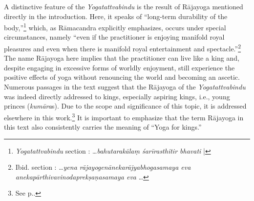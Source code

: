A distinctive feature of the \emph{Yogatattvabindu} is the result of Rājayoga mentioned directly in the introduction. Here, it speaks of ``long-term durability of the body,''\footnote{\emph{Yogatattvabindu} section : \ldots \textit{bahutarakālaṃ śarīrasthitir bhavati} |} which, as Rāmacandra explicitly emphasizes, occurs under special circumstances, namely ``even if the practitioner is enjoying manifold royal pleasures and even when there is manifold royal entertainment and spectacle.''\footnote{Ibid. section : \ldots \textit{yena rājayogenānekarājyabhogasamaya eva anekapārthivavinodaprekṣaṇasamaya eva} \ldots} The name Rājayoga here implies that the practitioner can live like a king and, despite engaging in excessive forms of worldly enjoyment, still experience the positive effects of yoga without renouncing the world and becoming an ascetic. Numerous passages in the text suggest that the Rājayoga of the \textit{Yogatattvabindu} was indeed directly addressed to kings, especially aspiring kings, i.e., young princes (\textit{kumāra}s). Due to the scope and significance of this topic, it is addressed elsewhere in this work.\footnote{See p.\pageref{ytbaudience}.} It is important to emphasize that the term Rājayoga in this text also consistently carries the meaning of ``Yoga for kings.''

